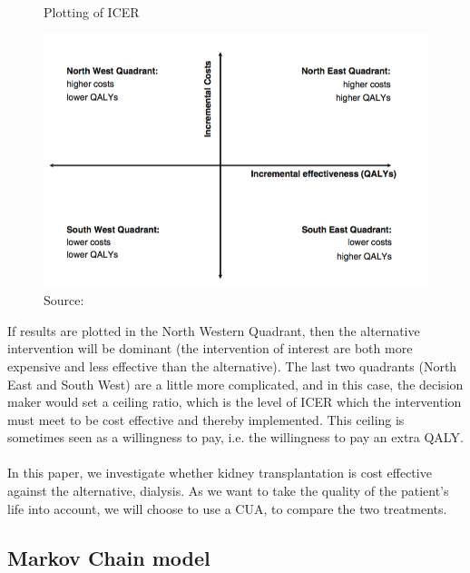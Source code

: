 \documentclass[a4paper,12pt]{article}
\begin{document}
\begin{figure} [h]
	\centering
	\caption{Plotting of ICER}
	\label{fig:ICER}
	\includegraphics[width=0.7\linewidth]{Pictures/ICER}
	\caption*{Source:  \cite{CUAbog} }
\end{figure}

If results are plotted in the North Western Quadrant, then the alternative intervention will be dominant (the intervention of interest are both more expensive and less effective than the alternative). The last two quadrants (North East and South West) are a little more complicated, and in this case, the decision maker would set a ceiling ratio, which is the level of ICER which the intervention must meet to be cost effective and thereby implemented.   This ceiling is sometimes seen as a willingness to pay, i.e. the willingness to pay an extra QALY. 
\\\\
In this paper, we investigate whether kidney transplantation is cost effective against the alternative, dialysis. As we want to take the quality of the patient’s life into account, we will choose to use a CUA, to compare the two treatments.  

\subsection{Markov Chain model}
\end{document}
